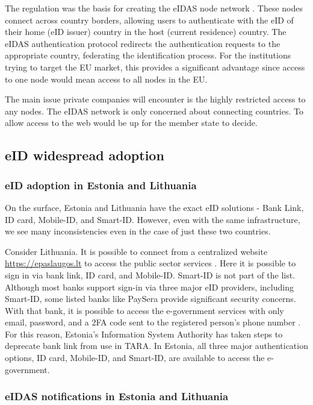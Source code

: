 The regulation was the basis for creating the eIDAS node network \cite{carretero2018federated}. These nodes connect across country borders, allowing users to authenticate with the eID of their home (eID issuer) country in the host (current residence) country. The eIDAS authentication protocol redirects the authentication requests to the appropriate country, federating the identification process. For the institutions trying to target the EU market, this provides a significant advantage since access to one node would mean access to all nodes in the EU.

The main issue private companies will encounter is the highly restricted access to any nodes. The eIDAS network is only concerned about connecting countries. To allow access to the web would be up for the member state to decide.

\subsection{eID widespread adoption}

\subsubsection{eID adoption in Estonia and Lithuania}

On the surface, Estonia and Lithuania have the exact eID solutions - Bank Link, ID card, Mobile-ID, and Smart-ID. However, even with the same infrastructure, we see many inconsistencies even in the case of just these two countries.

Consider Lithuania. It is possible to connect from a centralized website \url{https://epaslaugos.lt} to access the public sector services \cite{eidasnode-lt}. Here it is possible to sign in via bank link, ID card, and Mobile-ID. Smart-ID is not part of the list. Although most banks support sign-in via three major eID providers, including Smart-ID, some listed banks like PaySera provide significant security concerns. With that bank, it is possible to access the e-government services with only email, password, and a 2FA code sent to the registered person's phone number . For this reason, Estonia's Information System Authority has taken steps to deprecate bank link \cite{ria-deprecates-bank-link} from use in TARA. In Estonia, all three major authentication options, ID card, Mobile-ID, and Smart-ID, are available to access the e-government.

\subsubsection{eIDAS notifications in Estonia and Lithuania}

